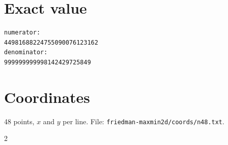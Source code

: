 \documentclass[11pt,a4paper]{article}
\begin{document}
\appendix
\section{Exact value}
{\small
\begin{verbatim}
numerator:
44981688224755090076123162
denominator:
999999999998142429725849
\end{verbatim}}

\section{Coordinates}
48 points, $x$ and $y$ per line. File: \texttt{friedman-maxmin2d/coords/n48.txt}.
{\tiny
\begin{multicols}{2}
\end{multicols}}
\end{document}
